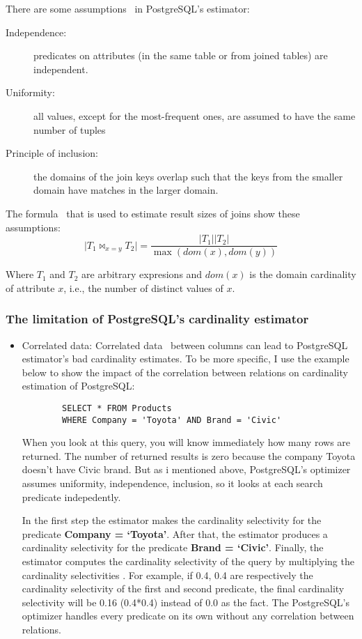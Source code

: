 There are some assumptions~\cite{JOB} in PostgreSQL's estimator:

\begin{description}
    \item[Independence:] predicates on attributes (in the same table or from
    joined tables) are independent.
    \item[Uniformity:] all values, except for the most-frequent ones, are assumed
    to have the same number of tuples
    \item[Principle of inclusion:] the domains of the join keys overlap such that
    the keys from the smaller domain have matches in the larger domain.
\end{description}

The formula~\cite{JOB} that is used to estimate result sizes of joins show these
assumptions:\\

\[
\vert T_{1} \bowtie_{x=y} T_{2}\vert =
\frac{{\vert {T_{1}\vert}}{\vert {T_{2}\vert}}}{\max(dom(x),dom(y))}
\]

Where $T_{1}$ and $T_{2}$ are arbitrary expresions and $dom(x)$ is the domain
cardinality of attribute $x$, i.e., the number of distinct values of $x$.

\subsubsection{The limitation of PostgreSQL's cardinality estimator}

\begin{itemize}
    \item Correlated data: Correlated data~\cite{CE limitations} between
        columns can lead to PostgreSQL estimator's bad cardinality estimates. To
        be more specific, I use the example below to show the impact of the
        correlation between relations on cardinality estimation of PostgreSQL\@:       
		\begin{verbatim}
        SELECT * FROM Products
        WHERE Company = 'Toyota' AND Brand = 'Civic'
        \end{verbatim}	           
        When you look at this query, you will know immediately how many rows are
        returned. The number of returned results is zero because the company
        Toyota doesn't have Civic brand. But as i mentioned above, PostgreSQL's
        optimizer assumes uniformity, independence, inclusion, so it looks at
        each search predicate indepedently.

        In the first step the estimator makes the cardinality selectivity for the predicate
        {\bfseries Company = `Toyota'}. After that, the estimator produces a
        cardinality selectivity for the predicate {\bfseries Brand = `Civic'}.
        Finally, the estimator computes the cardinality selectivity of the query by 	
        multiplying the cardinality selectivities . For example, if 0.4, 0.4 are 		
        respectively the cardinality selectivity of the first and second predicate, the 
        final cardinality selectivity will be 0.16 (0.4*0.4) instead of 0.0 as the fact. The 
        PostgreSQL's optimizer handles every predicate on its own without any correlation
        between relations.
\end{itemize}
